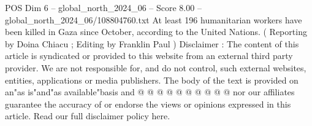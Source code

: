 \begin{textsample}{POS Dim 6 – global\_north\_2024\_06 – Score 8.00 – global\_north\_2024\_06/108804760.txt}
At least 196 humanitarian workers have been killed in Gaza since October, according to the United Nations. ( Reporting by Doina Chiacu ; Editing by Franklin Paul ) Disclaimer : The content of this article is syndicated or provided to this website from an external third party provider.
We are not responsible for, and do not control, such external websites, entities, applications or media publishers.
The body of the text is provided on an"as is"and"as available"basis and @ @ @ @ @ @ @ @ @ @ nor our affiliates guarantee the accuracy of or endorse the views or opinions expressed in this article.
Read our full disclaimer policy here.

\end{textsample}
